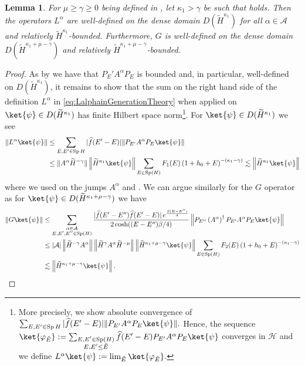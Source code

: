 \documentclass[11pt]{amsart}
\newcommand{\1}{\mathbbm{1}}
\newcommand{\cH}{\mathcal{H}}
\newcommand{\E}{\mathbb{E}}
\newcommand{\spec}{\operatorname{Sp}}
\renewcommand{\phi}{\varphi}
\theoremstyle{plain}
\newtheorem{lemma}[theorem]{Lemma}
\theoremstyle{definition}
\theoremstyle{remark}
\numberwithin{equation}{section}
\begin{document}
\begin{lemma}
\label{lem.LalphaGwelldefinedF}
For $\mu\ge \gamma\ge 0$ being defined in ,
let $\kappa_1> \gamma$ be such that  holds. Then the operators $L^\alpha$ are well-defined on the dense domain $D(\widetilde H^{\kappa_1})$ for all $\alpha\in\mathcal{A}$ and relatively $\widetilde H^{\kappa_1}$-bounded. Furthermore,  $G$ is well-defined on the dense domain $D(\widetilde H^{\kappa_1+\mu-\gamma})$ and relatively $\widetilde H^{\kappa_1+\mu-\gamma}$-bounded.
\end{lemma}
\begin{proof}
As by  we have that $P_E'A^\alpha P_E$ is bounded and, in particular, well-defined on $D(\widetilde H^{\kappa_1})$, it remains to show that the sum on the right hand side of the definition $L^\alpha$ in \eqref{eq:LalphainGenerationTheory} when applied on $\ket{\psi}\in D(\widetilde H^{\kappa_1})$ has finite Hilbert space norm\footnote{More precisely, we show absolute convergence of $\sum_{E,E'\in\spec{H}}|\widehat f(E'-E)|\|P_{E'}A^\alpha P_{E}\ket{\psi}\|.$ Hence, the sequence $\ket{\phi_{\tilde E}} := \sum_{\substack{E,E'\in\spec(H)\\E,E'\le \tilde E}} \widehat{f}(E'-E)P_{E'}A^\alpha P_{E}\ket{\psi}$ converges in $\cH$ and we define $L^\alpha\ket{\psi}:=\lim_{\tilde E}\ket{\phi_{\tilde E}}.$}.
For $\ket{\psi} \in D(\widetilde H^{\kappa_1})$ we see
\begin{align*}
    \left\|L^\alpha \ket{\psi}\right\|&\le \sum_{E,E'\in\spec{H}}|\widehat f(E'-E)|\|P_{E'}A^\alpha P_{E}\ket{\psi}\|  \\&\le \|A^{\alpha}\widetilde H^{-\gamma}\| \left\|\widetilde H^{\kappa_1}\ket{\psi}\right\|\sum_{E\in\spec(H)}F_1(E) \left(1+h_0+E\right)^{-(\kappa_1-\gamma)} \lesssim \left\|\widetilde H^{\kappa_1}\ket{\psi}\right\|
\end{align*}
where we used  on the jumps $A^\alpha$ and .
We can argue similarly for the $G$ operator as for $\ket{\psi}\in D(\widetilde H^{\kappa_1+\mu-\gamma})$ we have
\begin{align*}
\|G\ket{\psi}\|&\le \sum_{\substack{\alpha\in \mathcal{A}\\E,E',E''\in\spec(H)}}  \frac{|\widehat{f}(E'-E'')\widehat{f}(E'-E)|\,e^{\frac{\beta(E-E'')}{4}}}{2\cosh((E-E'')\beta/4)}\left\|P_{E''}\left(A^\alpha\right)^\dagger P_{E'} A^\alpha P_E\ket{\psi}\right\| \\&\le |\mathcal{A}|\left\|\widetilde H^{-\gamma}A^\alpha\right\|\left\|\widetilde H^{\gamma}A^\alpha \widetilde H^{-\mu}\right\| \left\|\widetilde H^{\kappa_1+\mu-\gamma}\ket{\psi}\right\|\sum_{E\in\spec(H)} F_2(E) \left(1+h_0+E\right)^{-(\kappa_1-\gamma)}\\&\lesssim \left\|\widetilde H^{\kappa_1+\mu-\gamma}\ket{\psi}\right\|.
\end{align*}
\end{proof}
\end{document}
